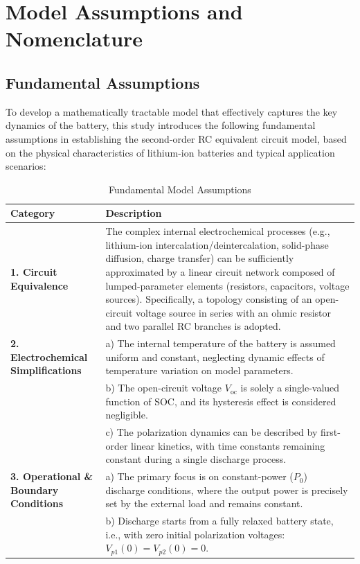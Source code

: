 \section{Model Assumptions and Nomenclature}
\subsection{Fundamental Assumptions}

To develop a mathematically tractable model that effectively captures the key dynamics of the battery, this study introduces the following fundamental assumptions in establishing the second-order RC equivalent circuit model, based on the physical characteristics of lithium-ion batteries and typical application scenarios:

\begin{table}[htbp]
\centering
\caption{Fundamental Model Assumptions}
\label{tab:assumptions}
\begin{tabular}{p{}p{}}
\toprule
\textbf{Category} & \textbf{Description} \\
\midrule
\textbf{1. Circuit Equivalence} & The complex internal electrochemical processes (e.g., lithium-ion intercalation/deintercalation, solid-phase diffusion, charge transfer) can be sufficiently approximated by a linear circuit network composed of lumped-parameter elements (resistors, capacitors, voltage sources). Specifically, a topology consisting of an open-circuit voltage source in series with an ohmic resistor and two parallel RC branches is adopted. \\
\textbf{2. Electrochemical Simplifications} & a) The internal temperature of the battery is assumed uniform and constant, neglecting dynamic effects of temperature variation on model parameters.\\
& b) The open-circuit voltage $V_{\text{oc}}$ is solely a single-valued function of SOC, and its hysteresis effect is considered negligible.\\
& c) The polarization dynamics can be described by first-order linear kinetics, with time constants remaining constant during a single discharge process.\\
\textbf{3. Operational \& Boundary Conditions} & a) The primary focus is on constant-power ($P_0$) discharge conditions, where the output power is precisely set by the external load and remains constant.\\
& b) Discharge starts from a fully relaxed battery state, i.e., with zero initial polarization voltages: $V_{p1}(0) = V_{p2}(0) = 0$.\\

\end{tabular}
\end{table}
